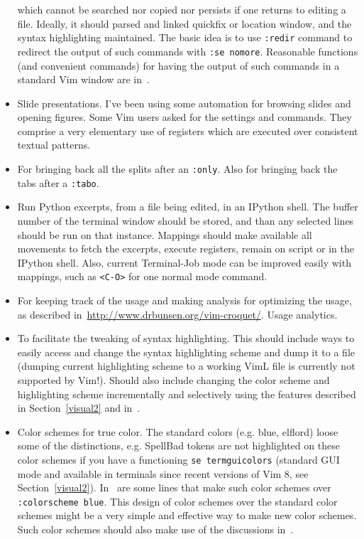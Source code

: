 \documentclass{article}
\newcommand{\ttt}[1] {
	\texttt{<#1>}}
\newcommand{\tttt}[1]{\texttt{#1}}
\begin{document}
\begin{itemize}
        which cannot be searched nor copied nor persists if one
        returns to editing a file.
        Ideally, it should parsed and linked quickfix or location
        window, and the syntax highlighting maintained.
        The basic idea is to use \tttt{:redir} command to redirect the output
        of such commands with \tttt{:se nomore}.
        Reasonable functions (and convenient commands) for having the
        output of such commands in a standard Vim window are
        in~\cite{vimrc}.
      \item Slide presentations. I've been using some automation for browsing
        slides and opening figures. Some Vim users asked for the settings and
        commands. They comprise a very elementary use of registers which are executed over
        consistent textual patterns.
      \item For bringing back all the splits after an \tttt{:only}.
        Also for bringing back the tabs after a \tttt{:tabo}.
      \item Run Python excerpts, from a file being edited, in an IPython shell. 
        The buffer number of the terminal window should be stored,
        and than any selected lines should be run on that instance.
        Mappings should make available all movements to fetch the
        excerpts, execute registers, remain on script or in the IPython shell.
        Also, current Terminal-Job mode can be improved easily with
        mappings, such as \ttt{C-O} for one normal mode command.
      \item For keeping track of the usage and making analysis
        for optimizing the usage, as described in~\url{http://www.drbunsen.org/vim-croquet/}.
        Usage analytics.
      \item To facilitate the tweaking of syntax highlighting.
        This should include ways to easily access and change the
        syntax highlighting scheme and dump it to a file (dumping
        current highlighting scheme to a working VimL file
        is currently not supported by Vim!).
        Should also include changing the color scheme and highlighting scheme incrementally
        and selectively using the features described in Section~\ref{visual2}
        and in~\cite{tokipona}.
      \item Color schemes for true color.
        The standard colors (e.g. blue, elflord) loose some of the distinctions,
        e.g. SpellBad tokens are not highlighted on these color schemes
        if you have a functioning \tttt{se termguicolors} (standard GUI mode
        and available in terminals since recent versions of Vim 8,
        see Section~\ref{visual2}).
        In~\cite{vimrc} are some lines that make such color schemes over
        \tttt{:colorscheme blue}.
        This design of color schemes over the standard color schemes might be
        a very simple and effective way to make new color schemes.
        Such color schemes should also make use of the discussions
        in~\cite{tokipona}.
    \end{itemize}
\end{document}
